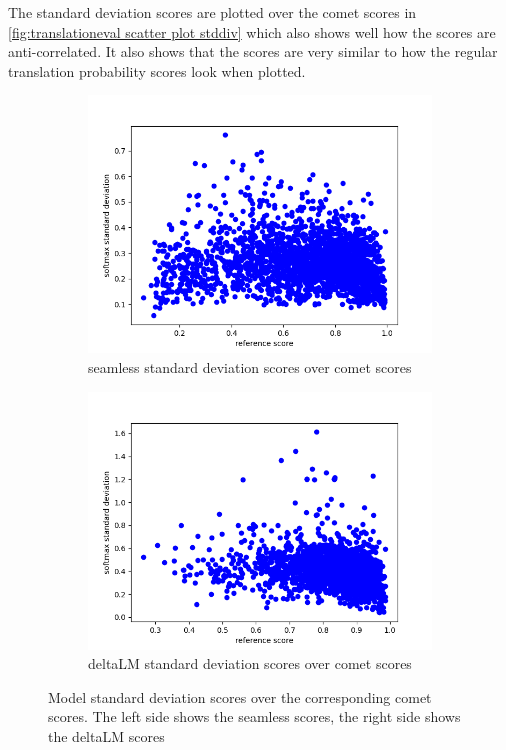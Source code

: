 The standard deviation scores are plotted over the comet scores in \autoref{fig:translationeval scatter plot stddiv} which also shows well how the scores are anti-correlated. It also shows that the scores are very similar to how the regular translation probability scores look when plotted. 
    \begin{figure}
            \centering%
    \begin{subfigure}{0.4\linewidth}
        \includegraphics[width=\textwidth]{Latex/sections/images/seamlessstddiv.png}
        \caption{seamless standard deviation scores over comet scores}
    \end{subfigure}
    \begin{subfigure}{0.4\linewidth}
        \includegraphics[width=\textwidth]{Latex/sections/images/dlmstddiv.png}
        \caption{deltaLM standard deviation scores over comet scores}
    \end{subfigure}
    \caption{Model standard deviation scores over the corresponding comet scores. The left side shows the seamless scores, the right side shows the deltaLM scores}
    \label{fig:translationeval scatter plot stddiv}
\end{figure}

